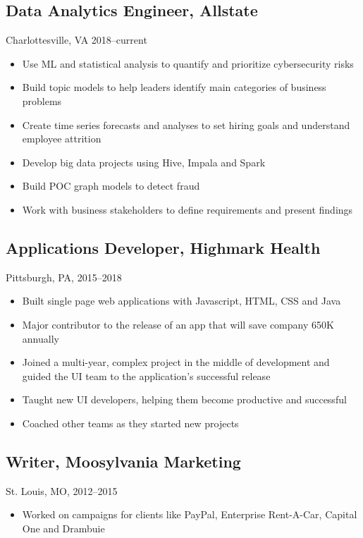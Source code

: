 \documentclass[11pt]{article}
\begin{document}
	\subsection{\normalsize{Data Analytics Engineer, Allstate}}
	{\fontsize{10pt}{\parskip}\selectfont Charlottesville, VA 2018--current}
	\begin{itemize}
	\item Use ML and statistical analysis to quantify and prioritize cybersecurity risks
	\item Build topic models to help leaders identify main categories of business problems
	\item Create time series forecasts and analyses to set hiring goals  \newline and understand employee attrition
	\item Develop big data projects using Hive, Impala and Spark
	\item Build POC graph models to detect fraud
	\item Work with business stakeholders to define requirements and present findings
	\end{itemize}

	 \subsection{\normalsize{Applications Developer, Highmark Health}}
		{\fontsize{10pt}{\parskip}\selectfont Pittsburgh, PA, 2015--2018}
		\begin{itemize}
		\item Built single page web applications with Javascript, HTML, CSS and Java
		\item Major contributor to the release of an app that will save company 650K annually
		\item Joined a multi-year, complex project in the middle of development and guided the UI team to the application's successful release
		\item Taught new UI developers, helping them become productive and successful
		\item Coached other teams as they started new projects
		\end{itemize}

	\subsection{\normalsize{Writer, Moosylvania Marketing}}
	{\fontsize{10pt}{\parskip}\selectfont St. Louis, MO, 2012--2015}
	\begin{itemize}
		\item Worked on campaigns for clients like PayPal, Enterprise Rent-A-Car, Capital One and Drambuie
	\end{itemize}
\end{document}
